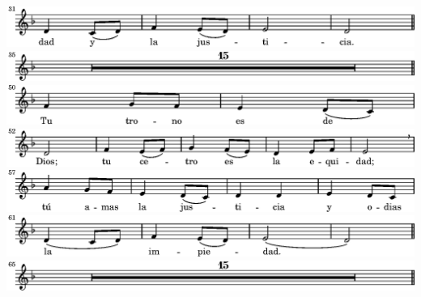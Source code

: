 \ifx\betweenLilyPondSystem \undefined
  \linebreak
\else
  \expandafter{}%
\fi
\includegraphics{b0/lily-2159aa8d-9}%
\ifx\betweenLilyPondSystem \undefined
  \linebreak
\else
  \expandafter{}%
\fi
\includegraphics{b0/lily-2159aa8d-10}%
\ifx\betweenLilyPondSystem \undefined
  \linebreak
\else
  \expandafter{}%
\fi
\includegraphics{b0/lily-2159aa8d-11}%
\ifx\betweenLilyPondSystem \undefined
  \linebreak
\else
  \expandafter{}%
\fi
\includegraphics{b0/lily-2159aa8d-12}%
\ifx\betweenLilyPondSystem \undefined
  \linebreak
\else
  \expandafter{}%
\fi
\includegraphics{b0/lily-2159aa8d-13}%
\ifx\betweenLilyPondSystem \undefined
  \linebreak
\else
  \expandafter{}%
\fi
\includegraphics{b0/lily-2159aa8d-14}%
\ifx\betweenLilyPondSystem \undefined
  \linebreak
\else
  \expandafter{}%
\fi
\includegraphics{b0/lily-2159aa8d-15}%
\ifx\betweenLilyPondSystem \undefined
